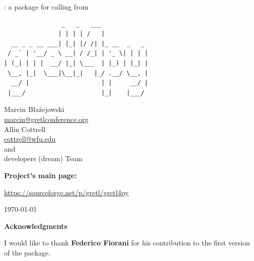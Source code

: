 \documentclass[a4paper,final]{gretl4pydoc}
\newcommand{\gretlpy}{\pkg{gretl4py}\xspace}
\begin{document}
	\raggedbottom
	\pagestyle{headings}
\begin{titlepage}
\centering
{\LARGE {}: a package for calling  from  \par}

\vspace{1.5cm}

\begin{BVerbatim}
                _   _   ___
               | | | | /   |
  __ _ _ __ ___| |_| |/ /| |_ __  _   _
 / _` | '__/ _ \ __| / /_| | '_ \| | | |
| (_| | | |  __/ |_| \___  | |_) | |_| |
 \__, |_|  \___|\__|_|   |_/ .__/ \__, |
  __/ |                    | |     __/ |
 |___/                     |_|    |___/
\end{BVerbatim}

\vspace{1cm}
{\Large%
	Marcin Błażejowski\\
	{\small \url{marcin@gretlconference.org}}\\
	Allin Cottrell\\
	{\small \url{cottrell@wfu.edu}}\\
	{\centering and}\\
	 developers (dream) Team}

\vspace{4cm}\textbf{Project's main page:}

\url{https://sourceforge.net/p/gretl/gretl4py}

\vspace{1.5cm}{\Large Version \gretlpyversion}

{\large \today}

\vfil{\Large\textbf{Acknowledgments}}

I would like to thank \textbf{Federico Fiorani} for
his contribution to the first version of the \gretlpy package.
\end{titlepage}
	\tableofcontents

	
	
	
	
	

	\listoftables

	\listoffigures

	\printindex

	
	

	\appendix
		
\end{document}
